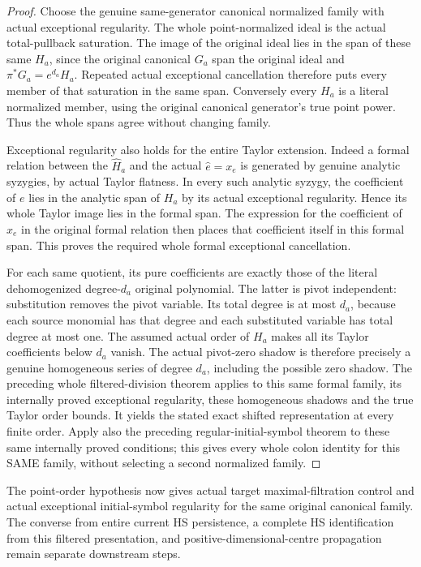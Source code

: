 \begin{proof}
Choose the genuine same-generator canonical normalized family with
actual exceptional regularity. The whole point-normalized ideal is
the actual total-pullback saturation. The image of the original ideal
lies in the span of these same $H_a$, since the original canonical
$G_a$ span the original ideal and $\pi^*G_a=e^{d_a}H_a$.
Repeated actual exceptional cancellation therefore puts every member
of that saturation in the same span. Conversely every $H_a$ is a
literal normalized member, using the original canonical generator's
true point power. Thus the whole spans agree without changing family.

Exceptional regularity also holds for the entire Taylor extension.
Indeed a formal relation between the $\widehat H_a$ and the actual
$\widehat e=x_e$ is generated by genuine analytic syzygies, by actual
Taylor flatness. In every such analytic syzygy, the coefficient of
$e$ lies in the analytic span of $H_a$ by its actual exceptional
regularity. Hence its whole Taylor image lies in the formal span.
The expression for the coefficient of $x_e$ in the original formal
relation then places that coefficient itself in this formal span.
This proves the required whole formal exceptional cancellation.

For each same quotient, its pure coefficients are exactly those of
the literal dehomogenized degree-$d_a$ original polynomial. The latter
is pivot independent: substitution removes the pivot variable. Its
total degree is at most $d_a$, because each source monomial has that
degree and each substituted variable has total degree at most one.
The assumed actual order of $H_a$ makes all its Taylor coefficients
below $d_a$ vanish. The actual pivot-zero shadow is therefore precisely
a genuine homogeneous series of degree $d_a$, including the possible
zero shadow. The preceding whole filtered-division theorem applies to
this same formal family, its internally proved exceptional regularity,
these homogeneous shadows and the true Taylor order bounds. It yields
the stated exact shifted representation at every finite order. Apply
also the preceding regular-initial-symbol theorem to these same internally
proved conditions; this gives every whole colon identity for this SAME
family, without selecting a second normalized family.
\end{proof}

The point-order hypothesis now gives actual target maximal-filtration
control and actual exceptional initial-symbol regularity for the same
original canonical family. The converse from
entire current HS persistence, a complete HS identification from this
filtered presentation, and positive-dimensional-centre propagation
remain separate downstream steps.
